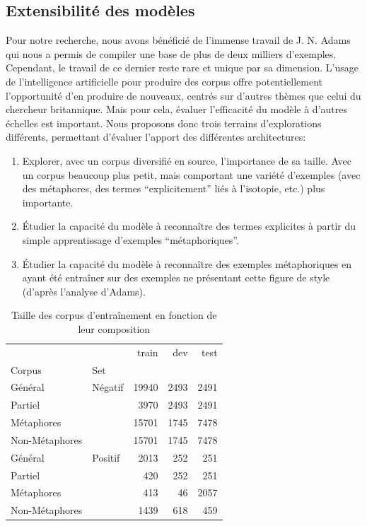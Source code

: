 \subsection{Extensibilité des modèles}

Pour notre recherche, nous avons bénéficié de l'immense travail de J. N. Adams qui nous a permis de compiler une base de plus de deux milliers d'exemples. Cependant, le travail de ce dernier reste rare et unique par sa dimension. L'usage de l'intelligence artificielle pour produire des corpus offre potentiellement l'opportunité d'en produire de nouveaux, centrés sur d'autres thèmes que celui du chercheur britannique. Mais pour cela, évaluer l'efficacité du modèle à d'autres échelles est important. Nous proposons donc trois terrains d'explorations différents, permettant d'évaluer l'apport des différentes architectures:

\begin{enumerate}
    \item Explorer, avec un corpus diversifié en source, l'importance de sa taille. Avec un corpus beaucoup plus petit, mais comportant une variété d'exemples (avec des métaphores, des termes \enquote{explicitement} liés à l'isotopie, etc.) plus importante.
    \item Étudier la capacité du modèle à reconnaître des termes explicites à partir du simple apprentissage d'exemples \enquote{métaphoriques}.
    \item Étudier la capacité du modèle à reconnaître des exemples métaphoriques en ayant été entraîner sur des exemples ne présentant cette figure de style (d'après l'analyse d'Adams).
\end{enumerate}

\begin{table}[]
    \centering
    \begin{tabular}{ll|rrr}
    \toprule
            &         &  train &   dev &  test \\
    Corpus & Set &        &       &       \\
    \midrule
    Général & Négatif &  19940 &  2493 &  2491 \\
    Partiel &  &   3970 &  2493 &  2491 \\
    Métaphores &  &  15701 &  1745 &  7478 \\
    Non-Métaphores &  &  15701 &  1745 &  7478 \\ \midrule
    Général & Positif &   2013 &   252 &   251 \\
    Partiel &  &    420 &   252 &   251 \\
    Métaphores &  &    413 &    46 &  2057 \\
    Non-Métaphores &  &   1439 &   618 &   459 \\
    \bottomrule
    \end{tabular}
    \caption{Taille des corpus d'entraînement en fonction de leur composition}
    \label{tab:chap4:dataset-sizes}
\end{table}

